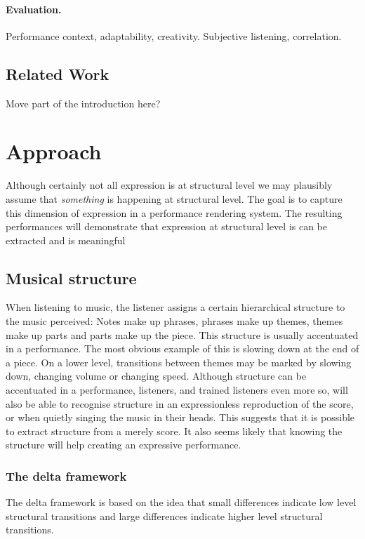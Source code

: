 \documentclass[a4paper,10pt]{article}
\begin{document}
\paragraph*{Evaluation.} Performance context, adaptability, creativity. Subjective listening, correlation.

\subsection{Related Work}
Move part of the introduction here?

\section{Approach}

Although certainly not all expression is at structural level we may plausibly assume that \emph{something} is happening at structural level. The goal is to capture this dimension of expression in a performance rendering system. The resulting performances will demonstrate that expression at structural level is can be extracted and is meaningful

\subsection{Musical structure}
When listening to music, the listener assigns a certain hierarchical structure to the music perceived: Notes make up phrases, phrases make up themes, themes make up parts and parts make up the piece. This structure is usually accentuated in a performance. The most obvious example of this is slowing down at the end of a piece. On a lower level, transitions between themes may be marked by slowing down, changing volume or changing speed. Although structure can be accentuated in a performance, listeners, and trained listeners even more so, will also be able to recognise structure in an expressionless reproduction of the score, or when quietly singing the music in their heads. This suggests that it is possible to extract structure from a merely score. It also seems likely that knowing the structure will help creating an expressive performance.

\subsubsection*{The delta framework}

The delta framework is based on the idea that small differences indicate low level structural transitions and large differences indicate higher level structural transitions. 
\end{document}
